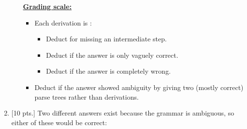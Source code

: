 \documentclass[11pt,fleqn]{article}
\begin{document}
\begin{enumerate}
\begin{enumerate}
\begin{info}{\textbf{\underline{Grading scale:}}}
\begin{itemize}
                      \addtolength{\itemsep}{2mm}

                      \item Each derivation is :

                            \vspace{1mm}

                            \begin{itemize}

                              \addtolength{\itemsep}{-.5mm}

                              \item Deduct  for missing an
                                    intermediate step.

                              \item Deduct  if the answer is only
                                    vaguely correct.

                              \item Deduct  if the answer is
                                    completely wrong.

                            \end{itemize}

                            \vspace{-2.5mm}

                      \item Deduct  if the answer showed ambiguity
                            by giving two (mostly correct) parse trees
                            rather than derivations.

                    \end{itemize}

                  \end{info}

          \end{enumerate}

          \vspace{-2.5mm}

    \item {[10 pts.]} Two different answers exist because the grammar is
          ambiguous, so either of these would be correct:

          \begin{multicols}{2}

            \centering



\end{multicols}
\end{enumerate}
\end{document}
